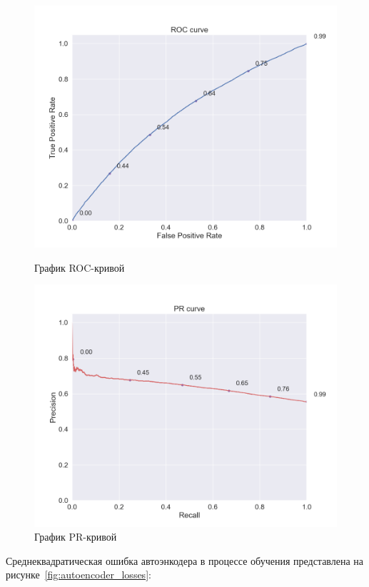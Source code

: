 \begin{figure}[h!]
\centering
\begin{minipage}{.5\textwidth}
\centering
\includegraphics[width=0.9\linewidth]{images/content/roc_curve}
\caption{График ROC-кривой}
\label{fig:content_roc}
\end{minipage}%
\begin{minipage}{.5\textwidth}
\centering
\includegraphics[width=0.9\linewidth]{images/content/pr_curve}
\caption{График PR-кривой}
\label{fig:content_pr}
\end{minipage}
\end{figure}

Среднеквадратическая ошибка автоэнкодера в процессе обучения представлена на рисунке~\ref{fig:autoencoder_losses}:

